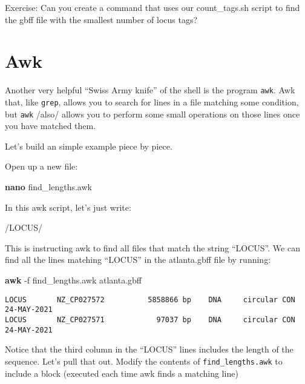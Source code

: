 \documentclass[
]{book}
\newenvironment{Shaded}{\begin{snugshade}}{\end{snugshade}}
\newcommand{\AttributeTok}[1]{\textcolor[rgb]{0.13,0.29,0.53}{#1}}
\newcommand{\FunctionTok}[1]{\textcolor[rgb]{0.13,0.29,0.53}{\textbf{#1}}}
\newcommand{\NormalTok}[1]{#1}
\newcommand{\OtherTok}[1]{\textcolor[rgb]{0.56,0.35,0.01}{#1}}
\newcommand{\SpecialStringTok}[1]{\textcolor[rgb]{0.31,0.60,0.02}{#1}}
\begin{document}
Exercise: Can you create a command that uses our count\_tags.sh script to find the gbff file with the smallest number of locus tags?

\section{Awk}\label{awk}

Another very helpful ``Swiss Army knife'' of the shell is the program \texttt{awk}. Awk that, like \texttt{grep}, allows you to search for lines in a file matching some condition, but \texttt{awk} /also/ allows you to perform some small operations on those lines once you have matched them.

Let's build an simple example piece by piece.

Open up a new file:

\begin{Shaded}
\begin{Highlighting}[]
\FunctionTok{nano}\NormalTok{ find\_lengths.awk}
\end{Highlighting}
\end{Shaded}

In this awk script, let's just write:

\begin{Shaded}
\begin{Highlighting}[]
\OtherTok{/}\SpecialStringTok{LOCUS}\OtherTok{/}
\end{Highlighting}
\end{Shaded}

This is instructing awk to find all files that match the string ``LOCUS''. We can find all the lines matching ``LOCUS'' in the atlanta.gbff file by running:

\begin{Shaded}
\begin{Highlighting}[]
\FunctionTok{awk} \AttributeTok{{-}f}\NormalTok{ find\_lengths.awk atlanta.gbff}
\end{Highlighting}
\end{Shaded}

\begin{verbatim}
LOCUS       NZ_CP027572          5858866 bp    DNA     circular CON 24-MAY-2021
LOCUS       NZ_CP027571            97037 bp    DNA     circular CON 24-MAY-2021
\end{verbatim}

Notice that the third column in the ``LOCUS'' lines includes the length of the sequence. Let's pull that out. Modify the contents of \texttt{find\_lengths.awk} to include a block (executed each time awk finds a matching line)
\end{document}
